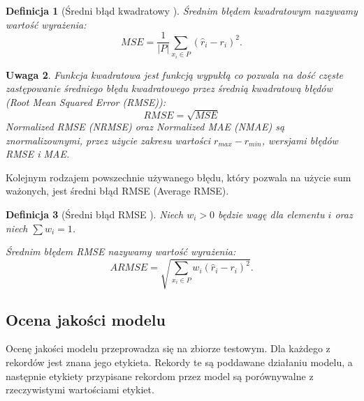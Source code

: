 \documentclass[12pt,a4paper]{report}
\newtheorem{df}{Definicja}[chapter]
\newtheorem{uwaga}[df]{Uwaga}
\begin{document}
\begin{df}[Średni błąd kwadratowy  {\citep[Sec 4.1.1]{rsh}}]
Średnim błędem kwadratowym nazywamy wartość wyrażenia:
$$
MSE = \frac{1}{|\mathit{P}|}\sum_{x_i \in \mathit{P}}(\widehat{r}_i-r_i)^2.
$$
\end{df}
\begin{uwaga}{\citep[Sec 4.1.1]{rsh}}
Funkcja kwadratowa jest funkcją wypukłą co pozwala na dość częste zastępowanie średniego błędu kwadratowego przez średnią kwadratową błędów (Root Mean Squared Error (RMSE)):
$$
RMSE = \sqrt{MSE}
$$
Normalized RMSE (NRMSE) oraz Normalized MAE (NMAE) są znormalizownymi, przez użycie zakresu wartości $r_{max} - r_{min}$, wersjami błędów RMSE i MAE.
\end{uwaga}
Kolejnym rodzajem powszechnie używanego błędu, który pozwala na użycie sum ważonych, jest średni błąd RMSE (Average RMSE).

\begin{df}[Średni błąd RMSE {\citep[Sec 4.1.1]{rsh}}]
Niech $w_i>0$ będzie wagę dla elementu $i$ oraz niech $\sum w_i = 1$.

Średnim błędem RMSE nazywamy wartość wyrażenia:
$$
ARMSE = \sqrt{\sum_{x_i\in \mathit{P}}w_{i}(\widehat{r}_i-r_i)^2}.
$$
\end{df}
\subsection{Ocena jakości modelu}
Ocenę jakości modelu przeprowadza się na zbiorze testowym. Dla każdego z rekordów jest znana jego etykieta. Rekordy te są poddawane działaniu modelu, a następnie etykiety przypisane rekordom przez model są porównywalne z rzeczywistymi wartościami etykiet.
\end{document}
